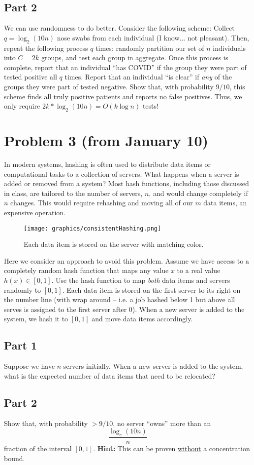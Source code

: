 \documentclass{article}
\begin{document}
\subsection*{Part 2}
We can use randomness to do better. Consider the following scheme: Collect $q = \log_2 (10n)$ nose swabs from each individual (I know... not pleasant). Then, repeat the following process $q$ times: randomly partition our set of $n$ individuals into $C=2k$ groups, and test each group in aggregate. Once this process is complete, report that an individual ``has COVID'' if the group they were part of tested positive all $q$ times. Report that an individual ``is clear'' if \emph{any} of the groups they were part of tested negative. Show that, with probability $9/10$, this scheme finds all truly positive patients and reports no false positives. Thus, we only require $2k * \log_2(10n) = O(k\log n)$ tests!

%

\section*{Problem 3 (from January 10)}

In modern systems, hashing is often used to distribute data items or computational tasks to a collection of servers. What happens when a server is added or removed from a system? Most hash functions, including those discussed in class, are tailored to the number of servers, $n$, and would change completely if $n$ changes. This would require rehashing and moving all of our $m$ data items, an expensive operation.

\begin{figure}[h]
	\centering
	\texttt{[image: graphics/consistentHashing.png]}
	\caption{Each data item is stored on the server with matching color.}
\end{figure}

Here we consider an approach to avoid this problem. Assume we have access to a completely random hash function that maps any value $x$ to a real value $h(x) \in [0,1]$. Use the hash function to map \emph{both} data items and servers randomly to $[0,1]$. Each data item is stored on the first server to its right on the number line (with wrap around -- i.e. a job hashed below 1 but above all serves is assigned to the first server after 0). When a new server is added to the system, we hash it to $[0,1]$ and move data items accordingly.

\subsection*{Part 1}
Suppose we have $n$ servers initially. When a new server is added to the system, what is the expected number of data items that need to be relocated? 
	
\subsection*{Part 2}
Show that, with probability $>9/10$, no server ``owns'' more than an $$\frac{\log_e (10 n)}{n}$$ fraction of the interval $[0,1]$. 
\textbf{Hint:} This can be proven \underline{without} a concentration bound.

%
\end{document}
